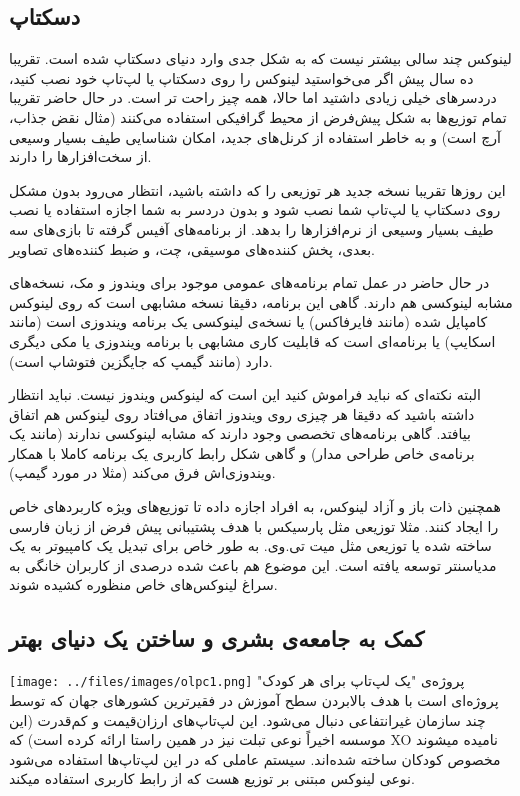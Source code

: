 \subsection*{دسکتاپ}
لینوکس چند سالی بیشتر نیست که به شکل جدی وارد دنیای دسکتاپ شده است. تقریبا ده سال پیش اگر می‌خواستید لینوکس را روی دسکتاپ یا لپ‌تاپ خود نصب کنید، دردسرهای خیلی زیادی داشتید اما حالا، همه چیز راحت تر است. در حال حاضر تقریبا تمام توزیع‌ها به شکل پیش‌فرض از محیط گرافیکی استفاده می‌کنند (مثال نقض جذاب،‌ آرچ است) و به خاطر استفاده از کرنل‌های جدید، امکان شناسایی طیف بسیار وسیعی از سخت‌افزارها را دارند.

این روزها تقریبا نسخه جدید هر توزیعی را که داشته باشید، انتظار می‌رود بدون مشکل روی دسکتاپ یا لپ‌تاپ شما نصب شود و بدون دردسر به شما اجازه استفاده یا نصب طیف بسیار وسیعی از نرم‌افزارها را بدهد. از برنامه‌های آفیس گرفته تا بازی‌های سه بعدی، پخش کننده‌های موسیقی، چت، و ضبط کننده‌های تصاویر.

در حال حاضر در عمل تمام برنامه‌های عمومی موجود برای ویندوز و مک، نسخه‌های مشابه لینوکسی هم دارند. گاهی این برنامه، دقیقا نسخه مشابهی است که روی لینوکس کامپایل شده (مانند فایرفاکس) یا نسخه‌ی لینوکسی یک برنامه ویندوزی است (مانند اسکایپ) یا برنامه‌ای است که قابلیت کاری مشابهی با برنامه ویندوزی یا مکی دیگری دارد (مانند گیمپ که جایگزین فتوشاپ است).

البته نکته‌ای که نباید فراموش کنید این است که لینوکس ویندوز نیست. نباید انتظار داشته باشید که دقیقا هر چیزی روی ویندوز اتفاق می‌افتاد روی لینوکس هم اتفاق بیافتد. گاهی برنامه‌های تخصصی وجود دارند که مشابه لینوکسی ندارند (مانند یک برنامه‌ی خاص طراحی مدار) و گاهی شکل رابط کاربری یک برنامه کاملا با همکار ویندوزی‌اش فرق می‌کند (مثلا در مورد گیمپ).

همچنین ذات باز و آزاد لینوکس، به افراد اجازه داده تا توزیع‌های ویژه کاربردهای خاص را ایجاد کنند. مثلا توزیعی مثل پارسیکس با هدف پشتیبانی پیش فرض از زبان فارسی ساخته شده یا توزیعی مثل میت تی.وی. به طور خاص برای تبدیل یک کامپیوتر به یک مدیاسنتر توسعه یافته است. این موضوع هم باعث شده درصدی از کاربران خانگی به سراغ لینوکس‌های خاص منظوره کشیده شوند.
\subsection*{کمک به جامعه‌ی بشری و ساختن یک دنیای بهتر}
\texttt{[image: ../files/images/olpc1.png]}
پروژه‌ی "یک لپ‌تاپ برای هر کودک" 
پروژه‌ای است با هدف بالابردن سطح آموزش در فقیرترین کشورهای جهان که توسط چند سازمان غیرانتفاعی دنبال می‌شود. این لپ‌تاپ‌های ارزان‌قیمت و کم‌قدرت (این موسسه اخیراً نوعی تبلت نیز در همین راستا ارائه کرده است) که XO نامیده میشوند مخصوص کودکان ساخته شده‌اند. سیستم عاملی که در این لپ‌تاپ‌ها استفاده می‌شود نوعی لینوکس مبتنی بر توزیع 
 هست که از رابط کاربری 
 استفاده میکند.

